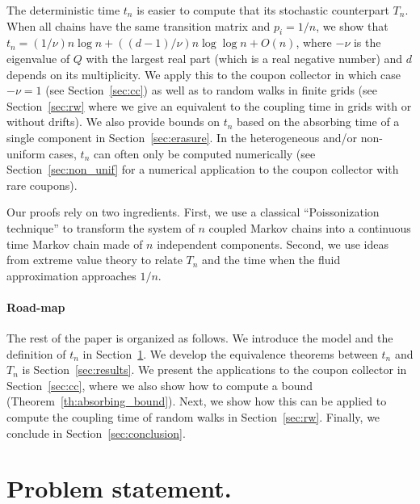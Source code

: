 \documentclass{aptpub}
\begin{document}
The deterministic time $t_n$ is easier to compute that its stochastic
counterpart $T_n$.  When all chains have the same transition matrix and
$p_i=1/n$, we show that
$t_n=(1/\nu) n\log n + ((d-1)/\nu)n\log\log n + O(n) $, where $-\nu$
is the eigenvalue of $Q$ with the largest real part (which is a real
negative number) and $d$ depends on its multiplicity.  We apply this
to the coupon collector in which case $-\nu=1$ (see
Section~\ref{sec:cc}) as well as to random walks in finite grids (see
Section~\ref{sec:rw} where we give an equivalent to the coupling time
in grids with or without drifts).  We also provide bounds on $t_n$
based on the absorbing time of a single component in
Section~\ref{sec:erasure}.  In the heterogeneous and/or non-uniform
cases, $t_n$ can often only be computed numerically (see
Section~\ref{sec:non_unif} for a numerical application to the coupon
collector with rare coupons).

Our proofs rely on two ingredients. First, we use a classical
``Poissonization technique'' to transform the system of $n$ coupled
Markov chains into a continuous time Markov chain made of $n$
independent components.  Second, we use ideas from extreme value
theory to relate $T_n$ and the time when the fluid approximation
approaches $1/n$.


\paragraph*{Road-map} The rest of the paper is organized as follows.
We introduce the model and the definition of $t_n$ in
Section~\ref{sec:problem}. We develop the equivalence theorems between
$t_n$ and $T_n$ is Section~\ref{sec:results}. We present the
applications to the coupon collector in Section~\ref{sec:cc}, where we
also show how to compute a bound
(Theorem~\ref{th:absorbing_bound}). Next, we show how this can be applied to
compute the coupling time of random walks in
Section~\ref{sec:rw}. Finally, we conclude in
Section~\ref{sec:conclusion}.

\section{Problem statement.}
\label{sec:problem}
\end{document}
